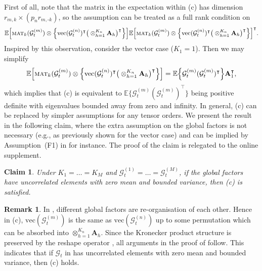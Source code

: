 \documentclass[aos]{imsart}
\theoremstyle{plain}
\newtheorem{claim}[axiom]{Claim}
\theoremstyle{definition}
\newtheorem{remark}{Remark}
\def\mat{\textnormal{\textsc{mat}}}
\def\E{\mathbb{E}}
\def\cG{\mathcal{G}} \def\cH{\boldsymbol{\mathcal{H}}} \def\cI{\mathcal{I}}
\def\bA{\mathbf{A}}
\def\trans{\intercal}
\def\vec{\mathrm{vec}}
\begin{document}
First of all, note that the matrix in the expectation within (c) has dimension $r_{m,k} \times (p_n r_{m,\text{-}k})$, so the assumption can be treated as a full rank condition on
{\small
\[
\E\Big[ \mat_k(\cG_t^{(m)}) \otimes \Big\{ \vec(\cG_t^{(n)})^\trans \big( \otimes_{h=1}^{K_n} \bA_{h} \big)^\trans \Big\} \Big] \E\Big[ \mat_k(\cG_t^{(m)}) \otimes \Big\{ \vec(\cG_t^{(n)})^\trans \big( \otimes_{h=1}^{K_n} \bA_{h} \big)^\trans \Big\} \Big]^\trans .
\] }
Inspired by this observation, consider the vector case ($K_1=1$). Then we may simplify
\begin{align*}
    \E\Big[ \mat_k(\cG_t^{(m)}) \otimes \Big\{ \vec(\cG_t^{(n)})^\trans \big( \otimes_{h=1}^{K_n} \bA_{h} \big)^\trans \Big\} \Big] = \E\Big\{ \cG_t^{(m)} (\cG_t^{(m)})^\trans \Big\} \bA_{1}^\trans ,
\end{align*}
which implies that (c) is equivalent to $\E\big\{ \cG_t^{(m)} (\cG_t^{(m)})^\trans \big\}$ being positive definite with eigenvalues bounded away from zero and infinity. In general, (c) can be replaced by simpler assumptions for any tensor orders. We present the result in the following claim, where the extra assumption on the global factors is not necessary (e.g., as previously shown for the vector case) and can be implied by Assumption~(F1) in \cite{CenLam2025} for instance. The proof of the claim is relegated to the online supplement.

\begin{claim}
\label{claim: assump_fac_simpler}
Under $K_1=\dots=K_M$ and $\cG_t^{(1)} = \dots =\cG_t^{(M)}$, if the global factors have uncorrelated elements with zero mean and bounded variance, then (c) is satisfied.
\end{claim}


\begin{remark}
\label{remark: explicit_fac_satisfy_assump}
In , different global factors are re-organisation of each other. Hence in (c), $\vec(\cG_t^{(m)})$ is the same as $\vec(\cG_t^{(n)})$ up to some permutation which can be absorbed into $\otimes_{h=1}^{K_n} \bA_{h}$. Since the Kronecker product structure is preserved by the reshape operator \citep{CenLam2025_KronProd}, all arguments in the proof of  follow. This indicates that if $\cG_t$ in  has uncorrelated elements with zero mean and bounded variance, then (c) holds.
\end{remark}
\end{document}
